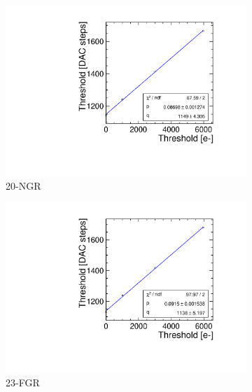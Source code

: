 \begin{figure}[htbp] \centering
  \begin{subfigure}[b]{0.45\textwidth}
    \includegraphics[width=\textwidth]{./figures/Calibration/THLcalibration_W0019_G07.pdf}
    \caption{20-NGR}
  \end{subfigure} \hfill
  \begin{subfigure}[b]{0.45\textwidth}
    \includegraphics[width=\textwidth]{./figures/Calibration/THLcalibration_W0019_F07.pdf}
    \caption{23-FGR}
  \end{subfigure}\\
  \begin{subfigure}[b]{0.45\textwidth}

\end{subfigure}
\end{figure}
